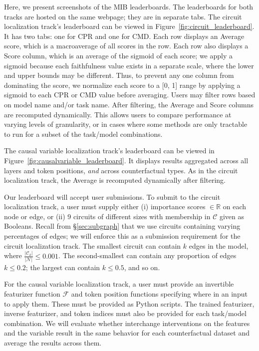 \documentclass{article}
\theoremstyle{plain}
\theoremstyle{definition}
\theoremstyle{remark}
\newcommand{\variabletrack}{causal variable localization track}
\newcommand{\circuittrack}{circuit localization track}
\newcommand{\mib}{\textsf{MIB}}
\begin{document}
Here, we present screenshots of the \mib{} leaderboards. The leaderboards for both tracks are hosted on the same webpage; they are in separate tabs. The circuit localization track's leaderboard can be viewed in Figure~\ref{fig:circuit_leaderboard}. It has two tabs: one for \textsf{CPR} and one for \textsf{CMD}. Each row displays an Average score, which is a macroaverage of all scores in the row. Each row also displays a Score column, which is an average of the sigmoid of each score; we apply a sigmoid because each faithfulness value exists in a separate scale, where the lower and upper bounds may be different. Thus, to prevent any one column from dominating the score, we normalize each score to a [0, 1] range by applying a sigmoid to each \textsf{CPR} or \textsf{CMD} value before averaging. Users may filter rows based on model name and/or task name. After filtering, the Average and Score columns are recomputed dynamically. This allows users to compare performance at varying levels of granularity, or in cases where some methods are only tractable to run for a subset of the task/model combinations.

The causal variable localization track's leaderboard can be viewed in Figure~\ref{fig:causalvariable_leaderboard}. It displays results aggregated across all layers and token positions, \emph{and} across counterfactual types. As in the \circuittrack{}, the Average is recomputed dynamically after filtering. 

Our leaderboard will accept user submissions. To submit to the \circuittrack, a user must supply either (i) importance scores $\in\mathbb{R}$ on each node or edge, or (ii) 9 circuits of different sizes with membership in $\mathcal{C}$ given as Booleans.
Recall from \S\ref{sec:subgraph} that we use circuits containing varying percentages of edges; we will enforce this as a submission requirement for the \circuittrack. The smallest circuit can contain $k$ edges in the model, where $\frac{|\mathcal{C}_k|}{|\mathcal{N}|} \leq 0.001$. The second-smallest can contain any proportion of edges $k \leq 0.2$; the largest can contain $k \leq 0.5$, and so on.

For the \variabletrack{}, a user must provide an invertible featurizer function $\mathcal{F}$ and token position functions specifying where in an input to apply them. These must be provided as Python scripts. The trained featurizer, inverse featurizer, and token indices must also be provided for each task/model combination. We will evaluate whether interchange interventions on the features and the variable result in the same behavior for each counterfactual dataset and average the results across them.
\end{document}
